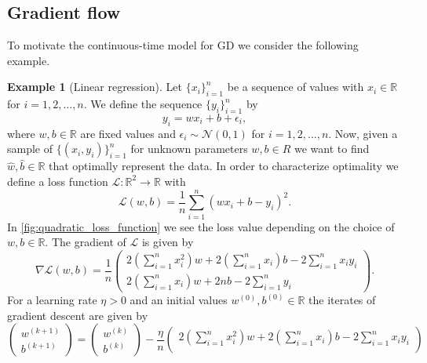 \documentclass[12pt]{article}
\theoremstyle{definition}
\newtheorem{example}[theorem]{Example}
\numberwithin{equation}{section}
\newcommand{\R}{\mathbb{R}}
\newcommand{\CL}{\mathcal{L}}
\newcommand{\CN}{\mathcal{N}}
\begin{document}
\subsection{Gradient flow}
To motivate the continuous-time model for GD we consider the following example.
\begin{example}[Linear regression]
  \label{ex:linear_regression}
  Let $\{x_i\}_{i=1}^n$ be a sequence of values with $x_i \in \R$ for $i = 1,2,\dots,n$. We define the sequence $\{y_i\}_{i=1}^n$ by
  \begin{equation*}
    y_i = wx_i + b + \epsilon_i,
  \end{equation*}
  where $w,b \in \R$ are fixed values and $\epsilon_i \sim \CN(0,1)$ for $i = 1, 2, \dots, n$.
  Now, given a sample of $\{(x_i, y_i)\}_{i=1}^n$ for unknown parameters $w, b \in R$ we want to find $\hat{w}, \hat{b} \in \R$ that optimally represent the data. In order to characterize optimality we define a loss function $\CL : \R^2 \rightarrow \R$ with 
  \begin{equation}
    \CL (w, b) = \frac{1}{n} \sum_{i=1}^n(wx_i + b - y_i)^2.
  \end{equation}
  In \autoref{fig:quadratic_loss_function} we see the loss value depending on the choice of $w,b \in \R$. The gradient of $\CL$ is given by
  \[
    \nabla \CL (w,b) = \frac{1}{n}
    \begin{pmatrix}
      2\left(\displaystyle\sum_{i=1}^n x_i^2\right)w + 2 \left(\displaystyle\sum_{i=1}^n x_i\right)b - 2 \displaystyle\sum_{i=1}^n x_i y_i \\
      2 \left(\displaystyle\sum_{i=1}^n x_i\right) w + 2nb - 2 \displaystyle\sum_{i=1}^n y_i
    \end{pmatrix}.
  \]
  For a learning rate $\eta > 0$ and an initial values $w^{(0)},b^{(0)} \in \R$ the iterates of gradient descent are given by
  \begin{equation}
    \begin{pmatrix}
      w^{(k+1)} \\
      b^{(k+1)}
    \end{pmatrix}
    =
    \begin{pmatrix}
      w^{(k)} \\
      b^{(k)}
    \end{pmatrix}
    - \frac{\eta}{n}
    \begin{pmatrix}
      2\left(\displaystyle\sum_{i=1}^n x_i^2\right)w + 2 \left(\displaystyle\sum_{i=1}^n x_i\right)b - 2 \displaystyle\sum_{i=1}^n x_i y_i \\

\end{pmatrix}
\end{equation}
\end{example}
\end{document}
